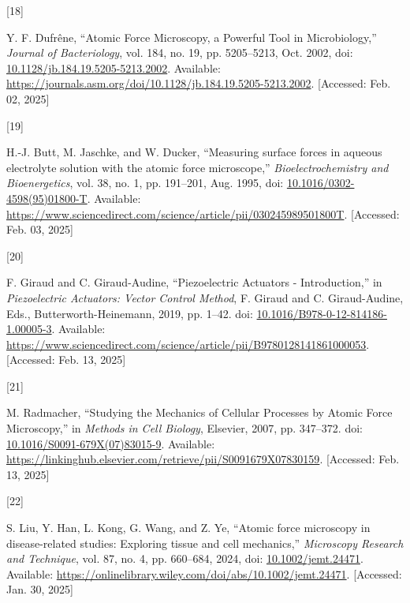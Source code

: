 \documentclass[
  paper=a4,
  ,captions=tableheading
]{scrartcl}
\newlength{\cslhangindent}
\newlength{\csllabelwidth}
\newenvironment{CSLReferences}[2] %
  {\begin{list}{}{%
   \setlength{\itemindent}{0pt}
   \setlength{\leftmargin}{0pt}
   \setlength{\parsep}{0pt}
   \ifodd #1
    \setlength{\leftmargin}{\cslhangindent}
    \setlength{\itemindent}{-1\cslhangindent}
   \fi
   \setlength{\itemsep}{#2\baselineskip}}}
  {\end{list}}
\newcommand{\CSLLeftMargin}[1]{\parbox[t]{\csllabelwidth}{\strut#1\strut}}
\newcommand{\CSLRightInline}[1]{\parbox[t]{\linewidth - \csllabelwidth}{\strut#1\strut}}
\begin{document}
\begin{CSLReferences}{0}{0}
\CSLLeftMargin{{[}18{]} }%
\CSLRightInline{Y. F. Dufrêne, {``Atomic {Force Microscopy}, a {Powerful
Tool} in {Microbiology},''} \emph{Journal of Bacteriology}, vol. 184,
no. 19, pp. 5205--5213, Oct. 2002, doi:
\href{https://doi.org/10.1128/jb.184.19.5205-5213.2002}{10.1128/jb.184.19.5205-5213.2002}.
Available:
\url{https://journals.asm.org/doi/10.1128/jb.184.19.5205-5213.2002}.
{[}Accessed: Feb. 02, 2025{]}}

\CSLLeftMargin{{[}19{]} }%
\CSLRightInline{H.-J. Butt, M. Jaschke, and W. Ducker, {``Measuring
surface forces in aqueous electrolyte solution with the atomic force
microscope,''} \emph{Bioelectrochemistry and Bioenergetics}, vol. 38,
no. 1, pp. 191--201, Aug. 1995, doi:
\href{https://doi.org/10.1016/0302-4598(95)01800-T}{10.1016/0302-4598(95)01800-T}.
Available:
\url{https://www.sciencedirect.com/science/article/pii/030245989501800T}.
{[}Accessed: Feb. 03, 2025{]}}

\CSLLeftMargin{{[}20{]} }%
\CSLRightInline{F. Giraud and C. Giraud-Audine, {``Piezoelectric
{Actuators} - {Introduction},''} in \emph{Piezoelectric {Actuators}:
{Vector Control Method}}, F. Giraud and C. Giraud-Audine, Eds.,
Butterworth-Heinemann, 2019, pp. 1--42. doi:
\href{https://doi.org/10.1016/B978-0-12-814186-1.00005-3}{10.1016/B978-0-12-814186-1.00005-3}.
Available:
\url{https://www.sciencedirect.com/science/article/pii/B9780128141861000053}.
{[}Accessed: Feb. 13, 2025{]}}

\CSLLeftMargin{{[}21{]} }%
\CSLRightInline{M. Radmacher, {``Studying the {Mechanics} of {Cellular
Processes} by {Atomic Force Microscopy},''} in \emph{Methods in {Cell
Biology}}, Elsevier, 2007, pp. 347--372. doi:
\href{https://doi.org/10.1016/S0091-679X(07)83015-9}{10.1016/S0091-679X(07)83015-9}.
Available:
\url{https://linkinghub.elsevier.com/retrieve/pii/S0091679X07830159}.
{[}Accessed: Feb. 13, 2025{]}}

\CSLLeftMargin{{[}22{]} }%
\CSLRightInline{S. Liu, Y. Han, L. Kong, G. Wang, and Z. Ye, {``Atomic
force microscopy in disease-related studies: {Exploring} tissue and cell
mechanics,''} \emph{Microscopy Research and Technique}, vol. 87, no. 4,
pp. 660--684, 2024, doi:
\href{https://doi.org/10.1002/jemt.24471}{10.1002/jemt.24471}.
Available:
\url{https://onlinelibrary.wiley.com/doi/abs/10.1002/jemt.24471}.
{[}Accessed: Jan. 30, 2025{]}}


\end{CSLReferences}
\end{document}
